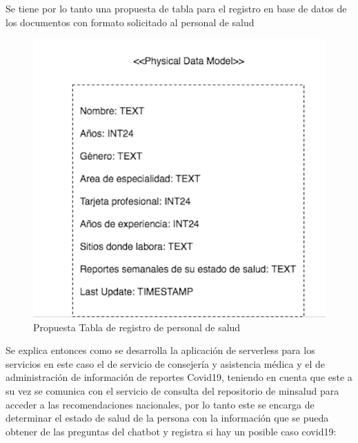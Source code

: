 \documentclass{article}
\begin{document}
\begin{itemize}
    Se tiene por lo tanto una propuesta de tabla para el registro en base de datos de los documentos con formato solicitado al personal de salud 
    \begin{figure}[h] 
    \centering
    \includegraphics[scale=0.4]{Table.png}
    \caption{Propuesta Tabla de registro de personal de salud}
    \label{Ser}
    \end{figure}



\end{itemize}

Se explica entonces como se desarrolla la aplicación de serverless para los servicios en este caso el de servicio de consejería y asistencia médica y el de administración de información de reportes Covid19, teniendo en cuenta que este a su vez se comunica con el servicio de consulta del repositorio de minsalud para acceder a las recomendaciones nacionales, por lo tanto este se encarga de determinar el estado de salud de la persona con la información que se pueda obtener de las preguntas del chatbot y registra si hay un posible caso covid19:
\end{document}
